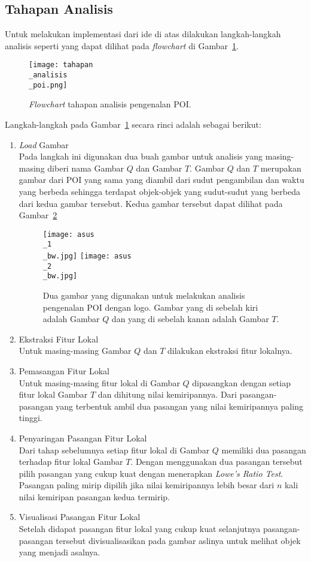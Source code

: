 \subsection{Tahapan Analisis}  
Untuk melakukan implementasi dari ide di atas dilakukan langkah-langkah analisis seperti yang dapat dilihat pada \textit{flowchart} di Gambar~\ref{fig:tahapan_analisis_poi}.

\begin{figure}[H]
	\centering
	\texttt{[image: tahapan\\\_analisis\\\_poi.png]}
	\caption{\textit{Flowchart} tahapan analisis pengenalan POI.}
	\label{fig:tahapan_analisis_poi}
\end{figure}

Langkah-langkah pada Gambar~\ref{fig:tahapan_analisis_poi} secara rinci adalah sebagai berikut:
\begin{enumerate}
	\item \textit{Load} Gambar \\
	Pada langkah ini digunakan dua buah gambar untuk analisis yang masing-masing diberi nama Gambar $Q$ dan Gambar $T$. Gambar $Q$ dan $T$ merupakan gambar dari POI yang sama yang diambil dari sudut pengambilan dan waktu yang berbeda sehingga terdapat objek-objek yang sudut-sudut yang berbeda dari kedua gambar tersebut. Kedua gambar tersebut dapat dilihat pada Gambar~\ref{fig:analisis_asus}
	\begin{figure}[H]
		\centering
		\texttt{[image: asus\\\_1\\\_bw.jpg]}
		\texttt{[image: asus\\\_2\\\_bw.jpg]}
		\caption{Dua gambar yang digunakan untuk melakukan analisis pengenalan POI dengan logo. Gambar yang di sebelah kiri adalah Gambar $Q$ dan yang di sebelah kanan adalah Gambar $T$.}
		\label{fig:analisis_asus}
	\end{figure}
	\item Ekstraksi Fitur Lokal \\
	Untuk masing-masing Gambar $Q$ dan $T$ dilakukan ekstraksi fitur lokalnya.
	\item Pemasangan Fitur Lokal \\
	Untuk masing-masing fitur lokal di Gambar $Q$ dipasangkan dengan setiap fitur lokal Gambar $T$ dan dihitung nilai kemiripannya. Dari pasangan-pasangan yang terbentuk ambil dua pasangan yang nilai kemiripannya paling tinggi.
	\item Penyaringan Pasangan Fitur Lokal \\
	Dari tahap sebelumnya setiap fitur lokal di Gambar $Q$ memiliki dua pasangan terhadap fitur lokal Gambar $T$. Dengan menggunakan dua pasangan tersebut pilih pasangan yang cukup kuat dengan menerapkan \textit{Lowe's Ratio Test}. Pasangan paling mirip dipilih jika nilai kemiripannya lebih besar dari $n$ kali nilai kemiripan pasangan kedua termirip.
	\item Visualisasi Pasangan Fitur Lokal \\
	Setelah didapat pasangan fitur lokal yang cukup kuat selanjutnya pasangan-pasangan tersebut divisualisasikan pada gambar aslinya untuk melihat objek yang menjadi asalnya.
\end{enumerate}

